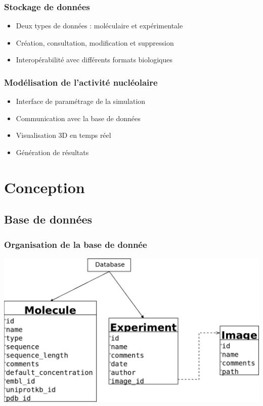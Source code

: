 \documentclass{beamer}
\begin{document}
\begin{frame}
  \frametitle{Stockage de données}

  \begin{block}{}
    \begin{itemize}
    \item Deux types de données : moléculaire et expérimentale
    \item Création, consultation, modification et suppression
    \item Interopérabilité avec différents formats biologiques
    \end{itemize}
  \end{block}

\end{frame}

\begin{frame}
  \frametitle{Modélisation de l'activité nucléolaire}

  \begin{block}{}
    \begin{itemize}
    \item Interface de paramétrage de la simulation
    \item Communication avec la base de données
    \item Visualisation 3D en temps réel
    \item Génération de résultats
    \end{itemize}
  \end{block}

\end{frame}

\section{Conception}

\subsection{Base de données}

\begin{frame}
  \frametitle{Organisation de la base de donnée}

  \begin{block}{}
  \begin{center}
    \includegraphics[width=0.4\columnwidth]{img/diagDB.png}
  \end{center}
  \end{block}

\end{frame}
\end{document}
